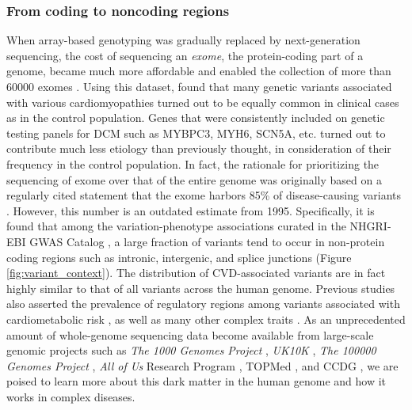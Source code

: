 \documentclass[letter]{bioinfo}
\begin{document}
\subsubsection*{From coding to noncoding regions}	
	When array-based genotyping was gradually replaced by next-generation sequencing, the cost of sequencing an \textit{exome}, the protein-coding part of a genome, became much more affordable and enabled the collection of more than 60000 exomes \citep{Lek:2016:Analysis}. Using this dataset, \cite{Walsh:2017:Reassessment} found that many genetic variants associated with various cardiomyopathies turned out to be equally common in clinical cases as in the control population. Genes that were consistently included on genetic testing panels for DCM such as MYBPC3, MYH6, SCN5A, etc. turned out to contribute much less etiology than previously thought, in consideration of their frequency in the control population.  In fact, the rationale for prioritizing the sequencing of exome over that of the entire genome was originally based on a regularly cited statement that the exome harbors 85\% of disease-causing variants \citep{Antonarakis:2001:nature}.  However, this number is an outdated estimate from 1995.  Specifically, it is found that among the variation-phenotype associations curated in the NHGRI-EBI GWAS Catalog \citep{MacArthur:2017:new}, a large fraction of variants tend to occur in non-protein coding regions such as intronic, intergenic, and splice junctions (Figure \ref{fig:variant_context}). The distribution of CVD-associated variants are in fact highly similar to that of all variants across the human genome. Previous studies also asserted the prevalence of regulatory regions among variants associated with cardiometabolic risk \citep{Franzen:2016:Cardiometabolic}, as well as many other complex traits \citep{Pickrell:2014:Joint}. As an unprecedented amount of whole-genome sequencing data become available from large-scale genomic projects such as \textit{The 1000 Genomes Project} \citep{1000G:2015:global}, \textit{UK10K} \citep{TheUK10KConsortium:2015:UK10K}, \textit{The 100000 Genomes Project} \citep{Caulfield:2017:100K}, \textit{All of Us} Research Program \citep{NIH:2018:All}, TOPMed \citep{NHLBI:2014:TransOmics}, and CCDG \citep{NHGRI:2016:CCDG}, we are poised to learn more about this dark matter in the human genome and how it works in complex diseases.
\end{document}
